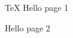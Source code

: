 \documentclass{article}
\begin{document}
\newpage
\TeX
Hello page 1

\newpage
Hello page 2
\end{document}
